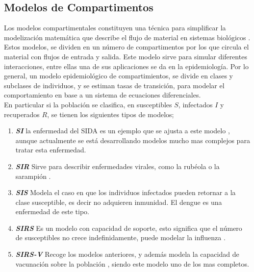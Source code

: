 \documentclass[journal]{IEEEtran}
\begin{document}
\subsection{Modelos de Compartimentos}\label{Modelos}
Los modelos compartimentales constituyen una técnica para simplificar la
modelización matemática que describe el flujo de material en sistemas
biológicos \cite{compartimientos}.
Estos modelos, se dividen en un número de compartimentos por los que circula el
material con flujos de entrada y salida. Este modelo
sirve para simular diferentes interacciones, entre ellas una de sus
aplicaciones se da en la epidemiología. Por lo general, un modelo
epidemiológico de compartimientos, se divide en clases y subclases de
individuos, y se estiman tasas de transición, para modelar el comportamiento
en base a un sistema de ecuaciones diferenciales.\\
\newline
En particular si la población se clasifica, en susceptibles $S$, infectados $I$
y recuperados $R$, se tienen los siguientes tipos de modelos;
\begin{enumerate}
	\item \textbf{\textit{SI}} la enfermedad del SIDA es un ejemplo que se
	      ajusta a este modelo \cite{SIDA}, aunque actualmente se está desarrollando
	      modelos mucho mas complejos para tratar esta enfermedad.
	\item \textbf{\textit{SIR}} Sirve para describir enfermedades virales,
	      como la rubéola o la sarampión \cite{Rubeola}.
	\item \textbf{\textit{SIS}} Modela el caso en que los individuos
	      infectados pueden retornar a la clase susceptible, es decir no adquieren
	      inmunidad. El dengue \cite{Dengue} es una enfermedad de este tipo.
	\item \textbf{\textit{SIRS}} Es un modelo con capacidad de soporte,
	      esto significa que el número de susceptibles no crece indefinidamente, puede
	      modelar la influenza \cite{Influenza}.
	\item \textbf{\textit{SIRS-V}} Recoge los modelos anteriores, y además
	      modela la capacidad de vacunación sobre la población \cite{Vacunacion}, siendo
	      este modelo uno de los mas completos.
\end{enumerate}
\end{document}
